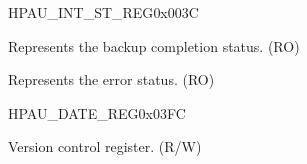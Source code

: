\begin{register}{H}{PAU\_INT\_ST\_REG}{0x003C}\label{regdesc:PAUINTSTREG}
%
%
%
\regnewline%
\begin{regdesc}\begin{reglist}
\label{fielddesc:PAUDONEINTST}\item [PAU\_DONE\_INT\_ST] Represents the backup completion status. (RO)
\label{fielddesc:PAUERRORINTST}\item [PAU\_ERROR\_INT\_ST] Represents the error status. (RO)
\end{reglist}\end{regdesc}
\end{register}


\begin{register}{H}{PAU\_DATE\_REG}{0x03FC}\label{regdesc:PAUDATEREG}
%
%
\regnewline%
\begin{regdesc}\begin{reglist}
\label{fielddesc:PAUDATE}\item [PAU\_DATE] Version control register. (R/W)
\end{reglist}\end{regdesc}
\end{register}